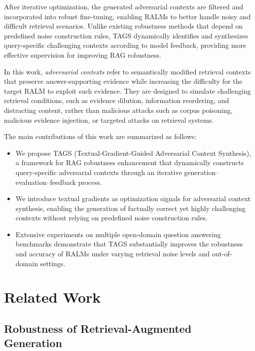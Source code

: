 \documentclass[11pt]{article}
\begin{document}
After iterative optimization, the generated adversarial contexts are filtered and incorporated into robust fine-tuning, enabling RALMs to better handle noisy and difficult retrieval scenarios. 
Unlike existing robustness methods that depend on predefined noise construction rules, TAGS dynamically identifies and synthesizes query-specific challenging contexts according to model feedback, providing more effective supervision for improving RAG robustness.


In this work, \emph{adversarial contexts} refer to semantically modified retrieval contexts that preserve answer-supporting evidence while increasing the difficulty for the target RALM to exploit such evidence. 
They are designed to simulate challenging retrieval conditions, such as evidence dilution, information reordering, and distracting content, rather than malicious attacks such as corpus poisoning, malicious evidence injection, or targeted attacks on retrieval systems.


The main contributions of this work are summarized as follows:

\begin{itemize}
    \item We propose TAGS (Textual-Gradient-Guided Adversarial Context Synthesis), a framework for RAG robustness enhancement that dynamically constructs query-specific adversarial contexts through an iterative generation--evaluation--feedback process.

    \item We introduce textual gradients as optimization signals for adversarial context synthesis, enabling the generation of factually correct yet highly challenging contexts without relying on predefined noise construction rules.

    \item Extensive experiments on multiple open-domain question answering benchmarks demonstrate that TAGS substantially improves the robustness and accuracy of RALMs under varying retrieval noise levels and out-of-domain settings.
\end{itemize}

\section{Related Work}

\subsection{Robustness of Retrieval-Augmented Generation}
\end{document}
